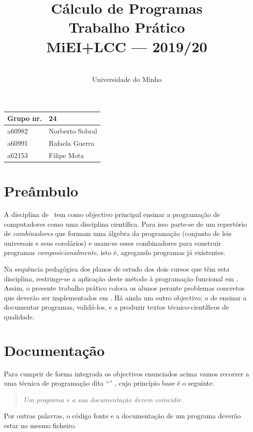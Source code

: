 \documentclass[a4paper]{article}
\title{
       	    Cálculo de Programas
\\
       	Trabalho Prático
\\
       	MiEI+LCC --- 2019/20
}
\author{
       	\dium
\\
       	Universidade do Minho
}
\date\mydate
\begin{document}
\maketitle

\begin{center}\large
\begin{tabular}{ll}
\textbf{Grupo} nr. & 24
\\\hline
a60982 & Norberto Sobral
\\
a60991 & Rafaela Guerra
\\
a62153 & Filipe Mota	
\end{tabular}
\end{center}

\section{Preâmbulo}

A disciplina de \CP\ tem como objectivo principal ensinar
a progra\-mação de computadores como uma disciplina científica. Para isso
parte-se de um repertório de \emph{combinadores} que formam uma álgebra da
programação (conjunto de leis universais e seus corolários) e usam-se esses
combinadores para construir programas \emph{composicionalmente}, isto é,
agregando programas já existentes.
  
Na sequência pedagógica dos planos de estudo dos dois cursos que têm
esta disciplina, restringe-se a aplicação deste método à programação
funcional em \Haskell. Assim, o presente trabalho prático coloca os
alunos perante problemas concretos que deverão ser implementados em
\Haskell.  Há ainda um outro objectivo: o de ensinar a documentar
programas, validá-los, e a produzir textos técnico-científicos de
qualidade.

\section{Documentação} Para cumprir de forma integrada os objectivos
enunciados acima vamos recorrer a uma técnica de programa\-ção dita
``'' \cite{Kn92}, cujo princípio base é o seguinte:
\begin{quote}\em Um programa e a sua documentação devem coincidir.
\end{quote} Por outras palavras, o código fonte e a documentação de um
programa deverão estar no mesmo ficheiro.
\end{document}
